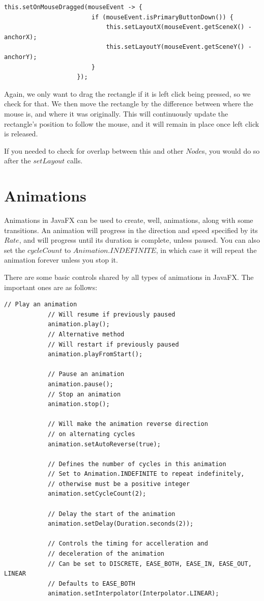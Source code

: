 \documentclass[a4paper]{report}
\begin{document}
				\begin{lstlisting}[gobble=20]
					this.setOnMouseDragged(mouseEvent -> {
						if (mouseEvent.isPrimaryButtonDown()) {
							this.setLayoutX(mouseEvent.getSceneX() - anchorX);
							this.setLayoutY(mouseEvent.getSceneY() - anchorY);
						}
					});
				\end{lstlisting}
				
				Again, we only want to drag the rectangle if it is left click being pressed, so we check for that. We then move the rectangle by the difference between where the mouse is, and where it was originally. This will continuously update the rectangle's position to follow the mouse, and it will remain in place once left click is released.
				
				If you needed to check for overlap between this and other $Node$s, you would do so after the $setLayout$ calls.
			
	
	\chapter{Animations}\label{chap:animations}
	
		Animations in JavaFX can be used to create, well, animations, along with some transitions. An animation will progress in the direction and speed specified by its $Rate$, and will progress until its duration is complete, unless paused. You can also set the $cycleCount$ to $Animation.INDEFINITE$, in which case it will repeat the animation forever unless you stop it.
		
		There are some basic controls shared by all types of animations in JavaFX. The important ones are as follows:
		
		\begin{lstlisting}[gobble=12]
			// Play an animation
			// Will resume if previously paused
			animation.play();
			// Alternative method
			// Will restart if previously paused
			animation.playFromStart();
			
			// Pause an animation
			animation.pause();
			// Stop an animation
			animation.stop();
			
			// Will make the animation reverse direction
			// on alternating cycles
			animation.setAutoReverse(true);
			
			// Defines the number of cycles in this animation
			// Set to Animation.INDEFINITE to repeat indefinitely,
			// otherwise must be a positive integer
			animation.setCycleCount(2);
			
			// Delay the start of the animation
			animation.setDelay(Duration.seconds(2));
			
			// Controls the timing for accelleration and
			// deceleration of the animation
			// Can be set to DISCRETE, EASE_BOTH, EASE_IN, EASE_OUT, LINEAR
			// Defaults to EASE_BOTH
			animation.setInterpolator(Interpolator.LINEAR);
		\end{lstlisting}
		
\end{document}
